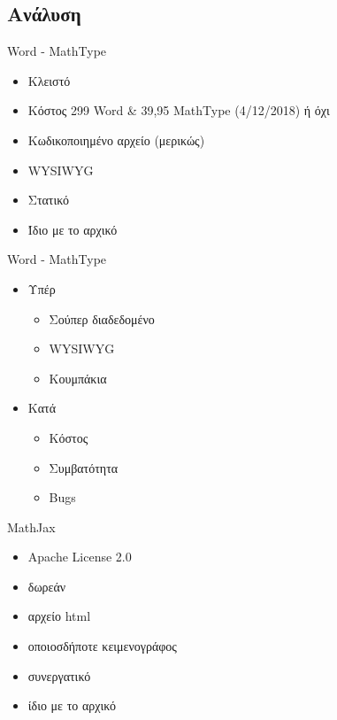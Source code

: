 \documentclass[greek]{beamer}
\begin{document}
\subsection{Ανάλυση}
\begin{frame}{Word - MathType}
  \begin{itemize}
    \item Κλειστό
    \item Κόστος 299 Word \& 39,95 MathType (4/12/2018) ή όχι
    \item Κωδικοποιημένο αρχείο (μερικώς)
    \item WYSIWYG
    \item Στατικό
    \item Ίδιο με το αρχικό
  \end{itemize}
\end{frame}

\begin{frame}{Word - MathType}
  \begin{itemize}
    \item Υπέρ
      \begin{itemize}
        \item<2-> Σούπερ διαδεδομένο
        \item<3-> WYSIWYG
        \item<4-> Κουμπάκια
      \end{itemize}
    \item Κατά
      \begin{itemize}
        \item<5-> Κόστος
        \item<6-> Συμβατότητα
        \item<7-> Bugs
      \end{itemize}
  \end{itemize}
\end{frame}

\begin{frame}{MathJax}
  \begin{itemize}
    \item Apache License 2.0
    \item δωρεάν
    \item αρχείο html
    \item οποιοσδήποτε κειμενογράφος
    \item συνεργατικό
    \item ίδιο με το αρχικό
  \end{itemize}
\end{frame}
\end{document}

